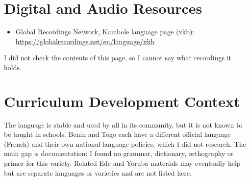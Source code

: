 \documentclass[12pt]{article}
\begin{document}
\section{Digital and Audio Resources}
\begin{itemize}
\item Global Recordings Network, Kambole language page (xkb): \url{https://globalrecordings.net/en/language/xkb}
\end{itemize}
I did not check the contents of this page, so I cannot say what recordings it holds.

\section{Curriculum Development Context}
The language is stable and used by all in its community, but it is not known to be taught in schools. Benin and Togo each have a different official language (French) and their own national-language policies, which I did not research. The main gap is documentation: I found no grammar, dictionary, orthography or primer for this variety. Related Ede and Yoruba materials may eventually help but are separate languages or varieties and are not listed here.
\end{document}
